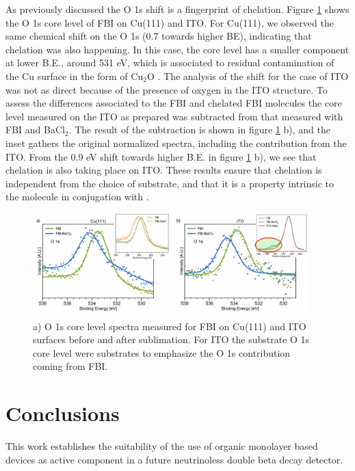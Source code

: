 \documentclass[aps,prl,reprint,longbibliography,superscriptaddress, english]{revtex4-1}
\begin{document}
As previously discussed the O 1s shift is a fingerprint of chelation. Figure \ref{XPS_FBI_Cu_ITO} shows the O 1s core level of FBI on Cu(111) and ITO. For Cu(111), we observed the same chemical shift on the O 1s (0.7 towards higher BE), indicating that chelation was also happening. In this case, the core level has a smaller component at lower B.E., around 531 eV, which is associated to residual contamination of the Cu surface in the form of Cu$_2$O \cite{zhu_surface_2013}.
The analysis of the shift for the case of ITO was not as direct because of the presence of oxygen in the ITO structure. To assess the differences associated to the FBI and chelated FBI molecules the core level measured on the ITO as prepared  was subtracted from that measured with FBI and BaCl$_2$. The result of the subtraction is shown in figure \ref{XPS_FBI_Cu_ITO} b), and the inset gathers the original normalized spectra, including the contribution from the ITO. From the 0.9 eV shift towards higher B.E. in figure \ref{XPS_FBI_Cu_ITO} b), we see that chelation is also taking place {on} ITO. These results ensure that chelation is independent from the choice of substrate, and that it is a property intrinsic to the molecule in conjugation with \Bapp. 


\begin{figure}[ht!]
	\includegraphics[width=0.95\textwidth]{figures/fig5_cu_ito.pdf}
	\caption{\label{XPS_FBI_Cu_ITO} 
    a) O 1s core level spectra measured for FBI on Cu(111) and ITO surfaces before and after \Bapp sublimation. For ITO the substrate O 1s core level were substrates to emphasize the O 1s contribution coming from FBI.}
\end{figure}  

\section{Conclusions}
This work establishes the suitability of the use of organic monolayer based devices as active component in a future neutrinoless double beta decay detector.
\end{document}
